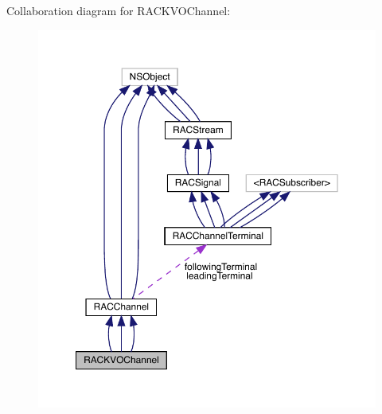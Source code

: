 Collaboration diagram for R\+A\+C\+K\+V\+O\+Channel\+:\nopagebreak
\begin{figure}[H]
\begin{center}
\leavevmode
\includegraphics[width=350pt]{interface_r_a_c_k_v_o_channel__coll__graph}
\end{center}
\end{figure}

